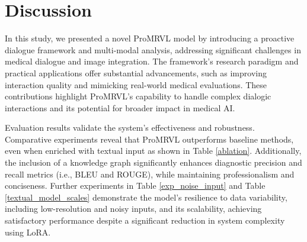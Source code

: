 \section{Discussion}
In this study, we presented a novel ProMRVL model by introducing a proactive dialogue framework and multi-modal analysis, addressing significant challenges in medical dialogue and image integration. The framework's research paradigm and practical applications offer substantial advancements, such as improving interaction quality and mimicking real-world medical evaluations. These contributions highlight ProMRVL's capability to handle complex dialogic interactions and its potential for broader impact in medical AI.


Evaluation results validate the system's effectiveness and robustness. Comparative experiments reveal that ProMRVL outperforms baseline methods, even when enriched with textual input as shown in Table \ref{ablation}. Additionally, the inclusion of a knowledge graph significantly enhances diagnostic precision and recall metrics (i.e., BLEU and ROUGE), while maintaining professionalism and conciseness. Further experiments in Table \ref{exp_noise_input} and Table \ref{textual_model_scales} demonstrate the model's resilience to data variability, including low-resolution and noisy inputs, and its scalability, achieving satisfactory performance despite a significant reduction in system complexity using LoRA.